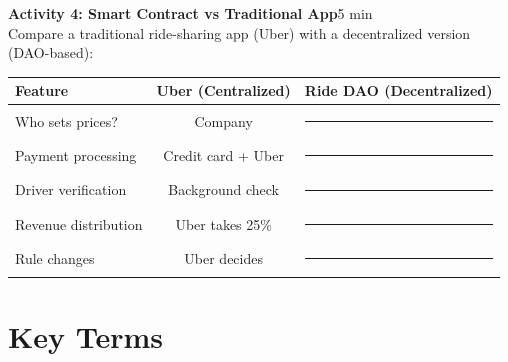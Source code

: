 \documentclass[11pt,a4paper]{article}
\newcommand{\activitybox}[3]{%
  \noindent\colorbox{mllavender4}{\parbox{\dimexpr\linewidth-2\fboxsep}{%
    \textbf{\color{mlpurple}#1}\hfill\textcolor{mlgray}{\small #2}\\[2pt]#3%
  }}\par\vspace{4pt}%
}
\newcommand{\fillcell}{\rule{2.2cm}{0.3pt}}
\begin{document}
\activitybox{Activity 4: Smart Contract vs Traditional App}{5 min}{%
Compare a traditional ride-sharing app (Uber) with a decentralized version (DAO-based):
\begin{center}
\renewcommand{\arraystretch}{1.3}
\begin{tabular}{lcc}
\toprule
\textbf{Feature} & \textbf{Uber (Centralized)} & \textbf{Ride DAO (Decentralized)} \\
\midrule
Who sets prices?       & Company            & \fillcell \\
Payment processing     & Credit card + Uber & \fillcell \\
Driver verification    & Background check   & \fillcell \\
Revenue distribution   & Uber takes 25\%    & \fillcell \\
Rule changes           & Uber decides       & \fillcell \\
\bottomrule
\end{tabular}
\end{center}
}

\vspace{4pt}

\section{Key Terms}
\end{document}
